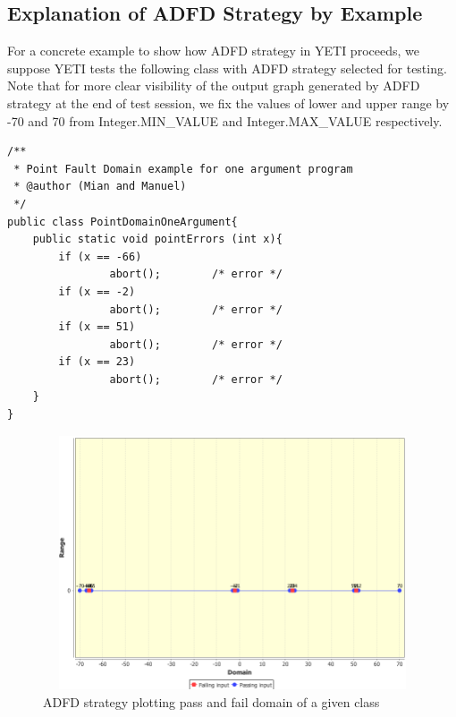  

\subsection{Explanation of ADFD Strategy by Example}\label{sec:example}
For a concrete example to show how ADFD strategy in YETI proceeds, we suppose YETI tests the following class with ADFD strategy selected for testing. Note that for more clear visibility of the output graph generated by ADFD strategy at the end of test session, we fix the values of lower and upper range by -70 and 70 from Integer.MIN\_VALUE and Integer.MAX\_VALUE respectively. 

\begin{lstlisting}
/**
 * Point Fault Domain example for one argument program
 * @author (Mian and Manuel)
 */
public class PointDomainOneArgument{
	public static void pointErrors (int x){
 		if (x == -66) 
			 	abort(); 		/* error */
		if (x == -2) 
			 	abort(); 		/* error */
 		if (x == 51) 
			 	abort(); 		/* error */
		if (x == 23) 
			 	abort(); 		/* error */
	}
}
\end{lstlisting}


\begin{figure}[H]
\centering
\includegraphics[width=14cm,height=7.5cm]{chapter5/pointDomainOneArgument.png}
\caption{ADFD strategy plotting pass and fail domain of a given class}
\label{fig:ADFD-example}
\end{figure}

